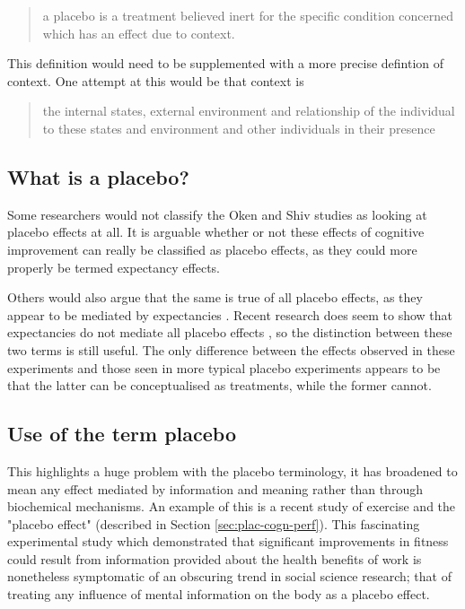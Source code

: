 \begin{quotation}
  a placebo is a treatment believed inert for the specific condition
  concerned which has an effect due to context.
\end{quotation}

This definition would need to be supplemented with a more precise defintion of context. One attempt at this would be that context is

\begin{quotation}
   the internal states, external environment and relationship of the individual to these states and environment and other individuals in their presence 
\end{quotation}

\subsection{What is a placebo?}
\label{sec:what-placebo}



Some researchers would not classify the Oken and Shiv studies as looking at placebo effects at all. It is arguable whether or not these effects of cognitive improvement can really be classified as placebo effects, as they could more properly be termed expectancy effects. 

Others would also argue that the same is true of all placebo effects, as they appear to be mediated by expectancies \cite{Kirsch1985, Kirsch1997,Montgomery1997}. Recent research does seem to show that expectancies do not mediate all placebo effects \cite{Benedetti2003a}, so the distinction between these two terms is still useful.  The only difference between the effects observed in these experiments and those seen in more typical placebo experiments appears to be that the latter can be conceptualised as treatments, while the former cannot. 

\subsection{Use of the term placebo}
\label{sec:use-term-placebo}



This highlights a huge problem with the placebo terminology, it has broadened to mean any effect mediated by information and meaning rather than through biochemical mechanisms. An example of this is a recent study of exercise and the "placebo effect" \cite{Crum2007} (described in Section \ref{sec:plac-cogn-perf}). This fascinating experimental study which demonstrated that significant improvements in fitness could result from information provided about the health benefits of work is nonetheless symptomatic of an obscuring trend in social science research; that of treating any influence of mental information on the body as a placebo effect. 

